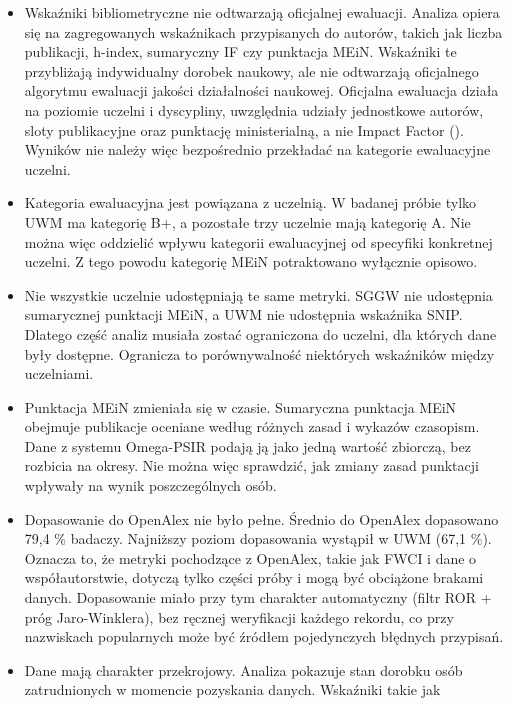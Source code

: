 \documentclass[
  polish,
  12pt,
  a4paper,
]{article}
\providecommand{\tightlist}{%
  \setlength{\itemsep}{0pt}\setlength{\parskip}{0pt}}
\begin{document}
\begin{itemize}
\tightlist
\item
  Wskaźniki bibliometryczne nie odtwarzają oficjalnej ewaluacji. Analiza
  opiera się na zagregowanych wskaźnikach przypisanych do autorów,
  takich jak liczba publikacji, h-index, sumaryczny IF czy punktacja
  MEiN. Wskaźniki te przybliżają indywidualny dorobek naukowy, ale nie
  odtwarzają oficjalnego algorytmu ewaluacji jakości działalności
  naukowej. Oficjalna ewaluacja działa na poziomie uczelni i dyscypliny,
  uwzględnia udziały jednostkowe autorów, sloty publikacyjne oraz
  punktację ministerialną, a nie Impact Factor
  ().
  Wyników nie należy więc bezpośrednio przekładać na kategorie
  ewaluacyjne uczelni.
\item
  Kategoria ewaluacyjna jest powiązana z uczelnią. W badanej próbie
  tylko UWM ma kategorię B+, a pozostałe trzy uczelnie mają kategorię A.
  Nie można więc oddzielić wpływu kategorii ewaluacyjnej od specyfiki
  konkretnej uczelni. Z tego powodu kategorię MEiN potraktowano
  wyłącznie opisowo.
\item
  Nie wszystkie uczelnie udostępniają te same metryki. SGGW nie
  udostępnia sumarycznej punktacji MEiN, a UWM nie udostępnia wskaźnika
  SNIP. Dlatego część analiz musiała zostać ograniczona do uczelni, dla
  których dane były dostępne. Ogranicza to porównywalność niektórych
  wskaźników między uczelniami.
\item
  Punktacja MEiN zmieniała się w czasie. Sumaryczna punktacja MEiN
  obejmuje publikacje oceniane według różnych zasad i wykazów czasopism.
  Dane z systemu Omega-PSIR podają ją jako jedną wartość zbiorczą, bez
  rozbicia na okresy. Nie można więc sprawdzić, jak zmiany zasad
  punktacji wpływały na wynik poszczególnych osób.
\item
  Dopasowanie do OpenAlex nie było pełne. Średnio do OpenAlex dopasowano
  79,4 \% badaczy. Najniższy poziom dopasowania wystąpił w UWM (67,1
  \%). Oznacza to, że metryki pochodzące z OpenAlex, takie jak FWCI i
  dane o współautorstwie, dotyczą tylko części próby i mogą być
  obciążone brakami danych. Dopasowanie miało przy tym charakter
  automatyczny (filtr ROR + próg Jaro-Winklera), bez ręcznej weryfikacji
  każdego rekordu, co przy nazwiskach popularnych może być źródłem
  pojedynczych błędnych przypisań.
\item
  Dane mają charakter przekrojowy. Analiza pokazuje stan dorobku osób
  zatrudnionych w momencie pozyskania danych. Wskaźniki takie jak

\end{itemize}
\end{document}

